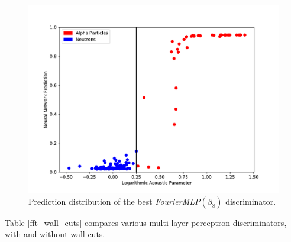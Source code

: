 \documentclass[10pt]{article}
\begin{document}
\begin{figure}[h]
    \centering
    \includegraphics[width=\textwidth]{banded_no_pos_input_hist}
    \caption{\label{banded_no_pos_input_hist} Prediction distribution of the best {\it FourierMLP}$(\beta_{8})$ discriminator.}
\end{figure}

Table \ref{fft_wall_cuts} compares various multi-layer perceptron discriminators, with and without wall cuts.
\end{document}
